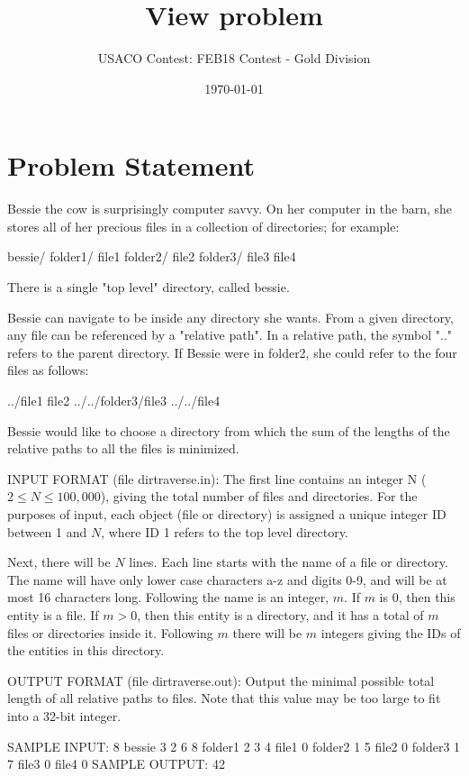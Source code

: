 \documentclass[12pt]{article}
\title{View problem}
\author{USACO Contest: FEB18 Contest - Gold Division}
\date{\today}
\begin{document}
\maketitle

\section*{Problem Statement}

Bessie the cow is surprisingly computer savvy.  On her computer in the barn, she
stores all of her precious files in a collection of directories; for example:


bessie/
  folder1/
    file1
    folder2/
      file2
  folder3/
    file3
  file4

There is a single "top level" directory, called bessie.

Bessie can navigate to be inside any directory she wants. From a given
directory, any file can be referenced by a "relative path".  In a relative path,
the symbol ".." refers to the parent directory. If Bessie were in folder2, she
could refer to the four files as follows:


../file1
file2
../../folder3/file3
../../file4

Bessie would like to choose a directory from which the sum of the lengths of the
relative paths to all the files is minimized.

INPUT FORMAT (file dirtraverse.in):
The first line contains an integer N ($2 \leq N \leq 100,000$), giving the total
number of files and directories.  For the purposes of input, each object (file
or directory) is assigned a unique integer ID between 1 and $N$, where ID 1 
refers to the top level directory.  

Next, there will be $N$ lines. Each line  starts with the name of a file or
directory. The name will have only lower case characters a-z and digits 0-9, and
will be at most 16 characters long. Following the name is an integer, $m$. If
$m$ is 0, then this entity is a file. If $m > 0$, then this entity is a
directory, and it has a total of $m$ files or directories inside it.  Following $m$
there will be $m$ integers giving the IDs of the entities in this directory.

OUTPUT FORMAT (file dirtraverse.out):
Output the minimal possible total length of all relative paths to files. Note
that this value may be too large to fit into a 32-bit integer.

SAMPLE INPUT:
8
bessie 3 2 6 8
folder1 2 3 4
file1 0
folder2 1 5
file2 0
folder3 1 7
file3 0
file4 0
SAMPLE OUTPUT: 
42
\end{document}
